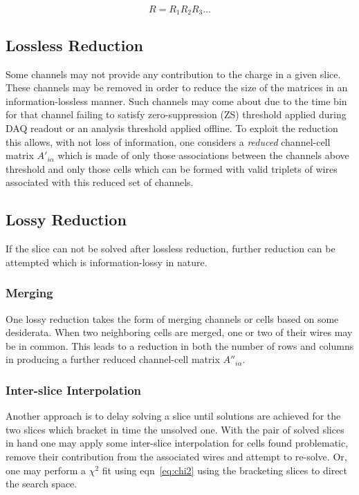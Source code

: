 \documentclass[letter]{article}
\begin{document}
\begin{equation}
  \label{eq:multipleR}
  R = R_1 R_2 R_3 ...
\end{equation}

\subsection{Lossless Reduction}

Some channels may not provide any contribution to the charge in a
given slice.
These channels may be removed in order to reduce the size of the
matrices in an information-lossless manner.
Such channels may come about due to the time bin for that channel failing to
satisfy zero-suppression (ZS) threshold applied during DAQ readout or
an analysis threshold applied offline.
To exploit the reduction this allows, with not loss of information,
one considers a \textit{reduced} channel-cell matrix
$A'_{i\alpha}$ which is made of only those associations
between the channels above threshold and only those cells which can be
formed with valid triplets of wires associated with this reduced set of
channels.

\subsection{Lossy Reduction}

If the slice can not be solved after lossless reduction, further
reduction can be attempted which is information-lossy in nature.


\subsubsection{Merging}

One lossy reduction takes the form of merging channels or cells based on
some desiderata.
When two neighboring cells are merged, one or two of their wires may be in common.
This leads to a reduction in both the number of rows and columns in
producing a further reduced channel-cell matrix $A''_{i\alpha}$.

\subsubsection{Inter-slice Interpolation}

Another approach is to delay solving a slice until solutions are
achieved for the two slices which
bracket in time the unsolved one.
With the pair of solved slices in hand one may apply some inter-slice
interpolation for cells found problematic, remove their contribution
from the associated wires and attempt to re-solve.
Or, one may perform a $\chi^2$ fit using eqn~\ref{eq:chi2} using the
bracketing slices to direct the search space. 
\end{document}
